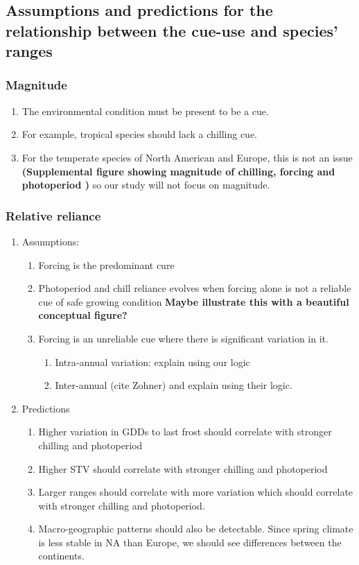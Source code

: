 \documentclass[11pt]{article}\usepackage[]{graphicx}\usepackage[]{color}
\begin{document}
\subsection*{Assumptions and predictions for the relationship between the cue-use and species' ranges}
\subsubsection{Magnitude}
\begin{enumerate}
\item The environmental condition must be present to be a cue.
\item For example, tropical species should lack a chilling cue.
\item For the temperate species of North American and Europe, this is not an issue \textbf{(Supplemental figure showing magnitude of chilling, forcing and photoperiod )} so our study will not focus on magnitude.
\end{enumerate}
\subsubsection{Relative reliance}
\begin{enumerate}
\item Assumptions:
\begin{enumerate}
\item Forcing is the predominant cure
\item Photoperiod and chill reliance evolves when forcing alone is not a reliable cue of safe growing condition \textbf{Maybe illustrate this with a beautiful conceptual figure?}
\item Forcing is an unreliable cue where there is significant variation in it.
\begin{enumerate}
\item Intra-annual variation: explain using our logic 
\item Inter-annual (cite Zohner) and explain using their logic.
\end{enumerate}
\end{enumerate}
\item Predictions
\begin{enumerate}
\item Higher variation in GDDs to last frost should correlate with stronger chilling and photoperiod
\item Higher STV should correlate with stronger chilling and photoperiod
\item Larger ranges should correlate with more variation which should correlate with stronger chilling and photoperiod.
\item Macro-geographic patterns should also be detectable. Since spring climate is less stable in NA than Europe, we should see differences between the continents.
\end{enumerate}
\end{enumerate}
\end{document}
